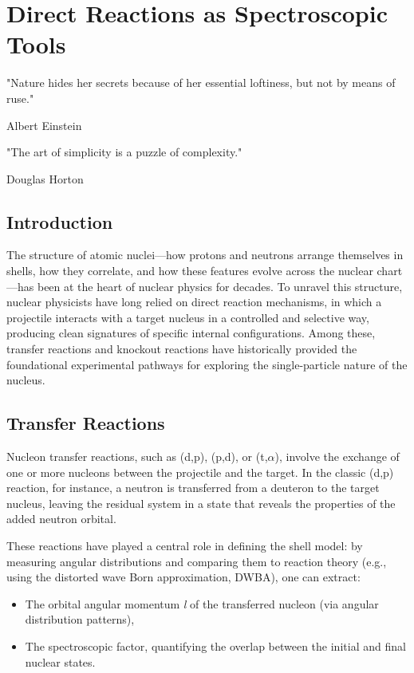
%

\chapter{Direct Reactions as Spectroscopic Tools}
\label{cha:reactions}

\epigraph{
	"Nature hides her secrets because of her essential loftiness, but not by means of ruse."
}{Albert Einstein}

\epigraph{
	"The art of simplicity is a puzzle of complexity."
}{Douglas Horton}



\section{Introduction}
\label{sec:introduction}

The structure of atomic nuclei—how protons and neutrons arrange themselves in shells, how they correlate, and how these features evolve across the nuclear chart—has been at the heart of nuclear physics for decades. To unravel this structure, nuclear physicists have long relied on direct reaction mechanisms, in which a projectile interacts with a target nucleus in a controlled and selective way, producing clean signatures of specific internal configurations. Among these, transfer reactions and knockout reactions have historically provided the foundational experimental pathways for exploring the single-particle nature of the nucleus.


\section{Transfer Reactions}
\label{sec:transfer_reactions}

Nucleon transfer reactions, such as (d,p), (p,d), or (t,$\alpha$), involve the exchange of one or more nucleons between the projectile and the target. In the classic (d,p) reaction, for instance, a neutron is transferred from a deuteron to the target nucleus, leaving the residual system in a state that reveals the properties of the added neutron orbital.

These reactions have played a central role in defining the shell model: by measuring angular distributions and comparing them to reaction theory (e.g., using the distorted wave Born approximation, DWBA), one can extract:
\begin{itemize}
	\item The orbital angular momentum \emph{l} of the transferred nucleon (via angular distribution patterns),
	\item The spectroscopic factor, quantifying the overlap between the initial and final nuclear states.
\end{itemize}


